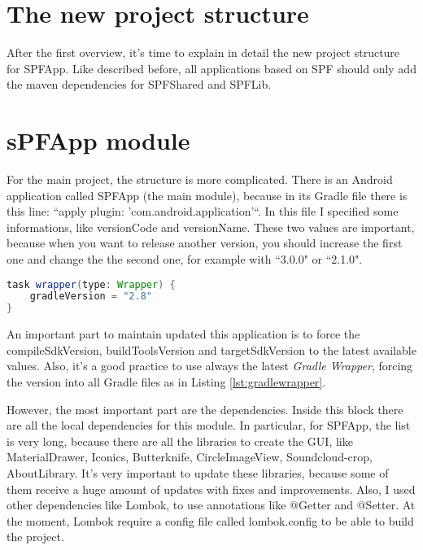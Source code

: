 \section{The new project structure}
After the first overview, it's time to explain in detail the new project structure for \textsf{SPFApp}. Like described before, all applications based on SPF should only add the maven dependencies for \textsf{SPFShared} and \textsf{SPFLib}.

\section*{sPFApp module}

For the main project, the structure is more complicated.
There is an Android application called \textsf{SPFApp} (the main module), because in its Gradle file there is this line: ``apply plugin: 'com.android.application'``.
In this file I specified some informations, like \textsf{versionCode} and \textsf{versionName}. These two values are important, because when you want to release another version, you should increase the first one and change the the second one, for example with ``3.0.0" or ``2.1.0".

\begin{lstlisting}[caption={Gradle wapper},label=lst:gradlewrapper, language=Java]
task wrapper(type: Wrapper) {
    gradleVersion = "2.8"
}
\end{lstlisting}

An important part to maintain updated this application is to force the \textsf{compileSdkVersion}, \textsf{buildToolsVersion} and \textsf{targetSdkVersion} to the latest available values. Also, it's a good practice to use always the latest \emph{Gradle Wrapper}, forcing the version into all Gradle files as in Listing \ref{lst:gradlewrapper}.

However, the most important part are the dependencies.
Inside this block there are all the local dependencies for this module. In particular, for SPFApp, the list is very long, because there are all the libraries to create the GUI, like \textsf{MaterialDrawer}, \textsf{Iconics}, \textsf{Butterknife}, \textsf{CircleImageView}, \textsf{Soundcloud-crop}, \textsf{AboutLibrary}.
It's very important to update these libraries, because some of them receive a huge amount of updates with fixes and improvements. Also, I used other dependencies like Lombok, to use annotations like @Getter and @Setter. At the moment, Lombok require a config file called \textsf{lombok.config} to be able to build the project.

